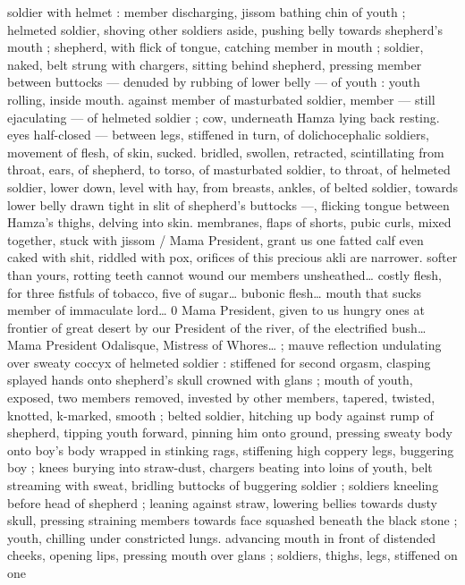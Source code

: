 soldier with helmet : member discharging, jissom bathing chin of 
youth ; helmeted soldier, shoving other soldiers aside, pushing belly 
towards shepherd's mouth ; shepherd, with flick of tongue, catching 
member in mouth ; soldier, naked, belt strung with chargers, sitting 
behind shepherd, pressing member between buttocks --- denuded 
by rubbing of lower belly --- of youth : youth rolling, inside mouth. 
against member of masturbated soldier, member --- still ejaculating 
--- of helmeted soldier ; cow, underneath Hamza lying back resting. 
eyes half-closed --- between legs, stiffened in turn, of 
dolichocephalic soldiers, movement of flesh, of skin, sucked. 
bridled, swollen, retracted, scintillating from throat, ears, of 
shepherd, to torso, of masturbated soldier, to throat, of helmeted 
soldier, lower down, level with hay, from breasts, ankles, of belted 
soldier, towards lower belly drawn tight in slit of shepherd's buttocks 
---, flicking tongue between Hamza's thighs, delving into skin. 
membranes, flaps of shorts, pubic curls, mixed together, stuck with 
jissom {\slash} {\td} {\gl} Mama President, grant us one fatted calf{\td} even caked 
with shit, riddled with pox, orifices of this precious akli are narrower. 
softer than yours, rotting teeth cannot wound our members 
unsheathed{\ldots} costly flesh, for three fistfuls of tobacco, five of 
sugar{\ldots} bubonic flesh{\ldots} mouth that sucks member of immaculate 
lord{\ldots} 0 Mama President, given to us hungry ones at frontier of great 
desert by our President of the river, of the electrified bush{\ldots} Mama 
President Odalisque, Mistress of Whores{\ldots}{\gr} ; mauve reflection 
undulating over sweaty coccyx of helmeted soldier : stiffened for 
second orgasm, clasping splayed hands onto shepherd's skull 
crowned with glans ; mouth of youth, exposed, two members 
removed, invested by other members, tapered, twisted, knotted, 
k-marked, smooth ; belted soldier, hitching up body against rump 
of shepherd, tipping youth forward, pinning him onto ground, 
pressing sweaty body onto boy's body wrapped in stinking rags, 
stiffening high coppery legs, buggering boy ; knees burying into 
straw-dust, chargers beating into loins of youth, belt streaming with 
sweat, bridling buttocks of buggering soldier ; soldiers kneeling 
before head of shepherd ; leaning against straw, lowering bellies 
towards dusty skull, pressing straining members towards face 
squashed beneath the black stone ; youth, chilling under constricted 
lungs. advancing mouth in front of distended cheeks, opening lips, 
pressing mouth over glans ; soldiers, thighs, legs, stiffened on one 
